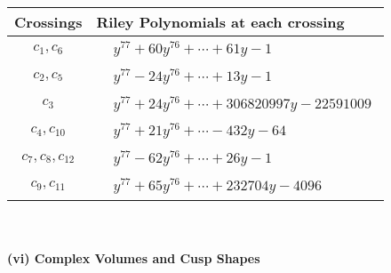 \documentclass[1p]{elsarticle_modified}
\theoremstyle{definition}
\begin{document}
\begin{tabular}{m{50pt}|m{274pt}}
Crossings & \hspace{64pt}Riley Polynomials at each crossing \\
\hline $$\begin{aligned}c_{1},c_{6}\end{aligned}$$&$\begin{aligned}
&y^{77}+60 y^{76}+\cdots+61 y-1
\end{aligned}$\\
\hline $$\begin{aligned}c_{2},c_{5}\end{aligned}$$&$\begin{aligned}
&y^{77}-24 y^{76}+\cdots+13 y-1
\end{aligned}$\\
\hline $$\begin{aligned}c_{3}\end{aligned}$$&$\begin{aligned}
&y^{77}+24 y^{76}+\cdots+306820997 y-22591009
\end{aligned}$\\
\hline $$\begin{aligned}c_{4},c_{10}\end{aligned}$$&$\begin{aligned}
&y^{77}+21 y^{76}+\cdots-432 y-64
\end{aligned}$\\
\hline $$\begin{aligned}c_{7},c_{8},c_{12}\end{aligned}$$&$\begin{aligned}
&y^{77}-62 y^{76}+\cdots+26 y-1
\end{aligned}$\\
\hline $$\begin{aligned}c_{9},c_{11}\end{aligned}$$&$\begin{aligned}
&y^{77}+65 y^{76}+\cdots+232704 y-4096
\end{aligned}$\\
\hline
\end{tabular}\\~\\
\newpage\flushleft \textbf{(vi) Complex Volumes and Cusp Shapes}
\end{document}
